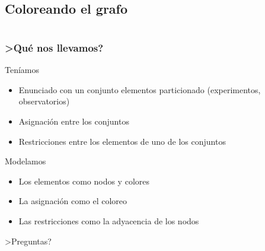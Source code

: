 \documentclass[table,dvipsnames]{beamer}
\begin{document}
\subsection{Coloreando el grafo}
\begin{frame}
\begin{center}
\end{center}
\end{frame}

\section{}
\begin{frame}
\frametitle{>Qu\'e nos llevamos?}
Ten\'iamos
\pause
\begin{itemize}
\item Enunciado con un conjunto elementos particionado (experimentos, observatorios)
\pause
\item Asignaci\'on entre los conjuntos
\pause
\item Restricciones entre los elementos de uno de los conjuntos
\end{itemize}

\vspace{10pt}
\pause
Modelamos
\pause
\begin{itemize}
\item Los elementos como nodos y colores
\pause
\item La asignaci\'on como el coloreo
\pause
\item Las restricciones como la adyacencia de los nodos
\end{itemize}

\begin{center}

\end{center}
\end{frame}

\begin{frame}
\begin{center}
\Huge{>Preguntas?}
\end{center}
\end{frame}
\end{document}
